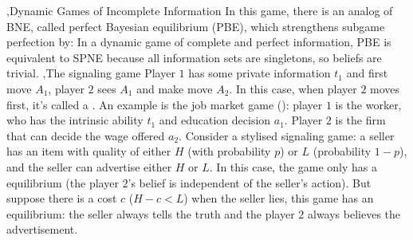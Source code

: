 \documentclass[12pt]{report}
\begin{document}
\sep{Dynamic Games of Incomplete Information}
In this game, there is an analog of BNE, called perfect Bayesian equilibrium (PBE), which strengthens subgame perfection by:
In a dynamic game of complete and perfect information, PBE is equivalent to SPNE because all information sets are singletons, so beliefs are trivial. 
\sep{The signaling game}
Player $1$ has some private information $t_1$ and first move $A_1$, player $2$ sees $A_1$ and make move $A_2$. In this case, when player $2$ moves first, it's called a . 
An example is the job market game (\cite{Spence1973}): player $1$ is the worker, who has the intrinsic ability $t_1$ and education decision $a_1$. Player $2$ is the firm that can decide the wage offered $a_2$.
Consider a stylised signaling game: a seller has an item with quality of either $H$ (with probability $p$) or $L$ (probability $1-p$), and the seller can advertise either $H$ or $L$. In this case, the game only has a 
 equilibrium (the player $2$'s belief is independent of the seller's action). But suppose there is a cost $c$ ($H-c<L$) when the seller lies, this game has an  equilibrium: the seller 
always tells the truth and the player $2$ always believes the advertisement.
\end{document}
